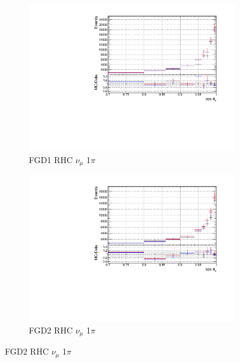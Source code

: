 \begin{figure}[!h]
\begin{subfigure}{0.49\textwidth}
  \centering
  \includegraphics[width=\textwidth]{figs/priorpred1D_t_FGD1_NuMuBkg_CC1pi_in_AntiNu_Mode}
  \caption{FGD1 RHC $\nu_{\mu}$ 1$\pi$}
\end{subfigure}
\begin{subfigure}{0.49\textwidth}
  \centering
  \includegraphics[width=\textwidth]{figs/priorpred1D_t_FGD2_NuMuBkg_CC1pi_in_AntiNu_Mode}
  \caption{FGD2 RHC $\nu_{\mu}$ 1$\pi$}
\end{subfigure}


\end{figure}
